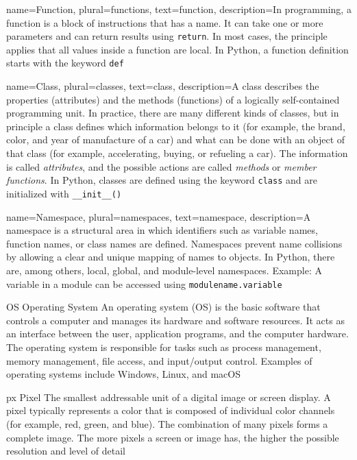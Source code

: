 {
	name={Function},
	plural={functions},
	text={function},
	description={In programming, a function is a block of instructions that has a name. It can take one or more parameters and can return results using \texttt{return}. In most cases, the principle applies that all values inside a function are local.	In Python, a function definition starts with the keyword \texttt{def}}
}

{
	name={Class},
	plural={classes},
	text={class},
	description={A class describes the properties (attributes) and the methods (functions) of a logically self-contained programming unit.	In practice, there are many different kinds of classes, but in	principle a class defines which information belongs to it (for example, the brand, color, and year of manufacture of a car) and what can be done with an object of that class (for example, accelerating, buying, or refueling a car). The information is called \emph{attributes}, and the possible actions	are called \emph{methods} or \emph{member functions}. In Python, classes are defined using the keyword \texttt{class} and are initialized with \texttt{\_\_init\_\_()}}
}

{
	name={Namespace},
	plural={namespaces},
	text={namespace},
	description={A namespace is a structural area in which identifiers such as variable names, function names, or class names are defined. Namespaces prevent name collisions by allowing a clear and unique mapping of names to objects.	In Python, there are, among others, local, global, and module-level namespaces. Example: A variable in a module can be accessed using \texttt{modulename.variable}}
}

	{OS}
	{Operating System}  %
	{An operating system (OS) is the basic software that controls a computer and manages its hardware and software resources. It acts as an interface between the user, application programs, and the computer hardware. The operating system is responsible for tasks such as process management, memory management, file access, and input/output control. Examples of operating systems include Windows, Linux, and macOS}

	{px}            %
	{Pixel}         %
	{The smallest addressable unit of a digital image or screen display. A pixel typically represents a color that is composed of individual color channels (for example, red, green, and blue). The combination of many pixels forms a complete image. The more pixels a screen or image has, the higher the possible
	resolution and level of detail} %

